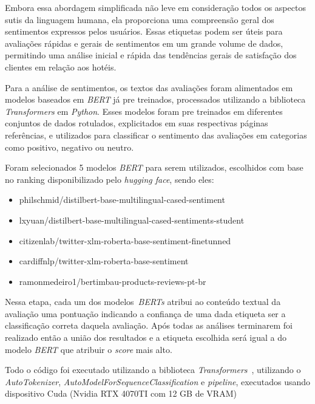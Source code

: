 Embora essa abordagem simplificada não leve em consideração todos os aspectos sutis da linguagem humana, ela proporciona uma compreensão geral dos sentimentos expressos pelos usuários. Essas etiquetas podem ser úteis para avaliações rápidas e gerais de sentimentos em um grande volume de dados, permitindo uma análise inicial e rápida das tendências gerais de satisfação dos clientes em relação aos hotéis.

Para a análise de sentimentos, os textos das avaliações foram alimentados em modelos baseados em \textit{BERT} já pre treinados, processados utilizando a biblioteca \textit{Transformers} em \textit{Python}. Esses modelos foram pre treinados em diferentes conjuntos de dados rotulados, explicitados em suas respectivas páginas referências, e utilizados para classificar o sentimento das avaliações em categorias como positivo, negativo ou neutro.

Foram selecionados 5 modelos \textit{BERT} para serem utilizados, escolhidos com base no ranking disponibilizado pelo \textit{hugging face}, sendo eles:

\begin{itemize}
	\item philschmid/distilbert-base-multilingual-cased-sentiment \cite{Sanh2019DistilBERTAD}
	\item lxyuan/distilbert-base-multilingual-cased-sentiments-student \cite{lik_xun_yuan_2023}
	\item citizenlab/twitter-xlm-roberta-base-sentiment-finetunned \cite{robertaCitizenlab2022}
	\item cardiffnlp/twitter-xlm-roberta-base-sentiment \cite{barbieri2022xlmtmultilinguallanguagemodels}
	\item ramonmedeiro1/bertimbau-products-reviews-pt-br \cite{bertimbauRamon2023}
\end{itemize}

Nessa etapa, cada um dos modelos~\textit{BERTs} atribui ao conteúdo textual da avaliação uma pontuação indicando a confiança de uma dada etiqueta ser a classificação correta daquela avaliação. Após todas as análises terminarem foi realizado então a união dos resultados e a etiqueta escolhida será igual a do modelo \textit{BERT} que atribuir o \emph{score} mais alto.

Todo o código foi executado utilizando a biblioteca \textit{Transformers}~\cite{Wolf_Transformers_State-of-the-Art_Natural_2020}, utilizando o \textit{AutoTokenizer}, \textit{AutoModelForSequenceClassification} e \textit{pipeline}, executados usando dispositivo Cuda (Nvidia RTX 4070TI com 12 GB de VRAM) %

